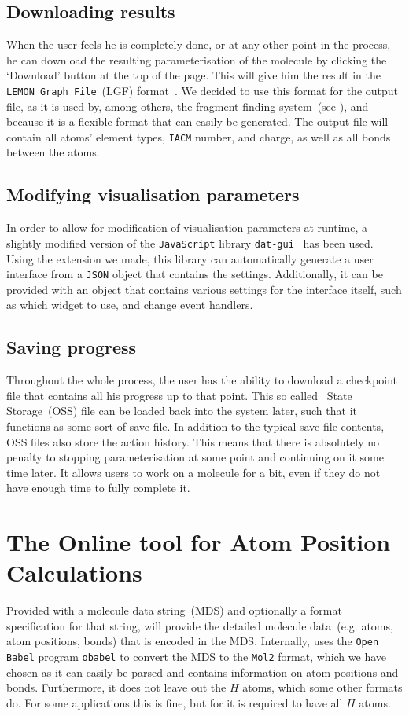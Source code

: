 \subsection{Downloading results}
When the user feels he is completely done, or at any other point in the process, he can download the resulting parameterisation of the molecule by clicking the `Download' button at the top of the page. This will give him the result in the \verb|LEMON Graph File|~(LGF) format~\cite{dezso2011lemon}. We decided to use this format for the output file, as it is used by, among others, the fragment finding system~(see ), and because it is a flexible format that can easily be generated. The output file will contain all atoms' element types, \verb|IACM| number, and charge, as well as all bonds between the atoms.


\subsection{Modifying visualisation parameters}
In order to allow for modification of visualisation parameters at runtime, a slightly modified version of the \verb|JavaScript| library \verb|dat-gui|~\cite{data2011dat} has been used. Using the extension we made, this library can automatically generate a user interface from a \verb|JSON| object that contains the settings. Additionally, it can be provided with an object that contains various settings for the interface itself, such as which widget to use, and change event handlers.


\subsection{Saving progress}
Throughout the whole process, the user has the ability to download a checkpoint file that contains all his progress up to that point. This so called \oframp\ State Storage~(OSS) file can be loaded back into the system later, such that it functions as some sort of save file. In addition to the typical save file contents, OSS files also store the action history. This means that there is absolutely no penalty to stopping parameterisation at some point and continuing on it some time later. It allows users to work on a molecule for a bit, even if they do not have enough time to fully complete it.



\section[\oapoc]{The Online tool for Atom Position Calculations}
Provided with a molecule data string~(MDS) and optionally a format specification for that string, \oapoc{} will provide the detailed molecule data~(e.g. atoms, atom positions, bonds) that is encoded in the MDS. Internally, \oapoc{} uses the \verb|Open Babel| program \verb|obabel| to convert the MDS to the \verb|Mol2| format, which we have chosen as it can easily be parsed and contains information on atom positions and bonds. Furthermore, it does not leave out the $H$ atoms, which some other formats do. For some applications this is fine, but for \oframp{} it is required to have all $H$ atoms.


